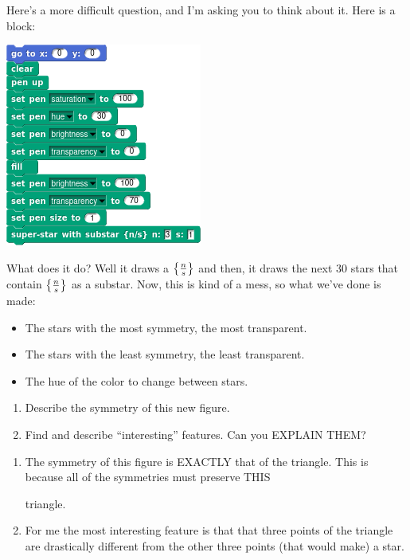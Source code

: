 \documentclass[noauthor,nooutcomes,12pt,hints,handout]{ximera}
\begin{document}
\begin{question} %
Here's a more difficult question, and I'm asking you to think about
it. Here is a block:
\begin{center}
\includegraphics{substarCoolBlock.png}
\end{center}
What does it do? Well it draws a $\left\{\frac{n}{s}\right\}$ and then, it
draws the next $30$ stars that contain $\left\{\frac{n}{s}\right\}$ as a
substar. Now, this is kind of a mess, so what we've done is made:
\begin{itemize}
  \item The stars with the most symmetry, the most transparent.
  \item The stars with the least symmetry, the least transparent.
  \item The hue of the color to change between stars.
\end{itemize}
\begin{enumerate}
\item Describe the symmetry of this new figure.
\item Find and describe ``interesting'' features. Can you EXPLAIN
  THEM?
\end{enumerate}

\begin{freeResponse}
  \begin{enumerate}
  \item The symmetry of this figure is EXACTLY that of the
    triangle. This is because all of the symmetries must preserve THIS
    \begin{center}
    \end{center}
    triangle.
  \item For me the most interesting feature is that that three points
    of the triangle are drastically different from the other three
    points (that would make) a star.


\end{enumerate}
\end{freeResponse}
\end{question}
\end{document}
